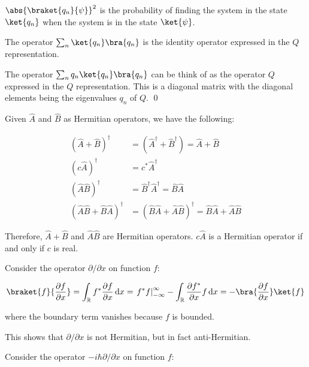 \documentclass[12pt]{article}
\begin{document}
$\abs{\braket{q_{n}}{\psi}}^2$ is the probability of finding the system in the state $\ket{q_n}$ when the system is in the state $\ket{\psi}$.

The operator $\sum_{n} \ket{q_{n}} \bra{q_{n}}$ is the identity operator expressed in the $Q$ representation.

The operator $\sum_{n} q_{n} \ket{q_{n}} \bra{q_{n}}$ can be think of as the operator $Q$ expressed in the $Q$ representation. This is a diagonal matrix with the diagonal elements being the eigenvalues $q_{n}$ of $Q$.
\qed


Given $\hat{A}$ and $\hat{B}$ as Hermitian operators, we have the following:

\begin{equation}
\begin{split}
    \left( \hat{A} + \hat{B} \right)^{\dagger} &= \left( \hat{A}^{\dagger} + \hat{B}^{\dagger} \right) = \hat{A} + \hat{B} \\
    \left( c \hat{A} \right)^{\dagger} &= c^{*} \hat{A}^{\dagger} \\
    \left( \hat{A} \hat{B} \right)^{\dagger} &= \hat{B}^{\dagger} \hat{A}^{\dagger} = \hat{B} \hat{A} \\
    \left( \hat{A} \hat{B} + \hat{B} \hat{A} \right)^{\dagger} &= \left( \hat{B} \hat{A} + \hat{A} \hat{B} \right)^{\dagger} = \hat{B} \hat{A} + \hat{A} \hat{B}
\end{split}
\end{equation}

Therefore, $\hat{A} + \hat{B}$ and $\hat{A} \hat{B}$ are Hermitian operators. $c \hat{A}$ is a Hermitian operator if and only if $c$ is real.

Consider the operator $\partial /\partial x$ on function $f$:

\begin{equation}
    \braket{f}{\frac{\partial f}{\partial x}} = \int_{\mathbb{R}} f^{*} \frac{\partial f}{\partial x} \, \mathrm{d}x = \left. f^{*} f \right|_{-\infty}^{\infty} - \int_{\mathbb{R}} \frac{\partial f^{*}}{\partial x} f \, \mathrm{d}x = - \bra{\frac{\partial f}{\partial x}} \ket{f}
\end{equation}

where the boundary term vanishes because $f$ is bounded. 

This shows that $\partial /\partial x$ is not Hermitian, but in fact anti-Hermitian.

Consider the operator $-i\hbar \partial /\partial x$ on function $f$:
\end{document}
